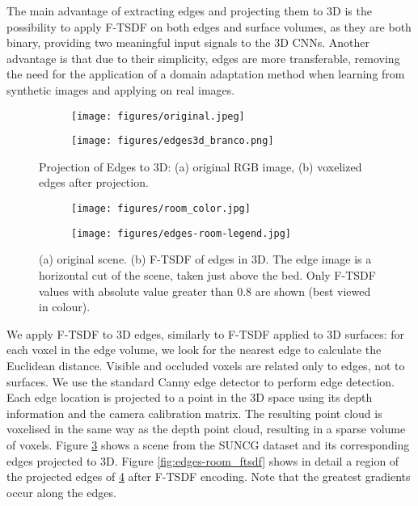 The main advantage of extracting edges and projecting them to 3D is the possibility to apply F-TSDF on both edges and surface volumes, as they are both binary, providing two meaningful input signals to the 3D CNNs.
Another advantage is that due to their simplicity,
edges are more transferable, removing the need for
the application of a domain adaptation method when learning from synthetic images and applying on real images.

\begin{figure}[t]
\centering  \begin{subfigure}{0.20\textwidth}
\texttt{[image: figures/original.jpeg]}
\caption{}
\label{fig:depth3d_original}
\end{subfigure}
\begin{subfigure}{0.20\textwidth}
\texttt{[image: figures/edges3d\_branco.png]}
\caption{}
\label{fig:depth3d_final}
\end{subfigure}
\caption{Projection of Edges to 3D: 
(a) original RGB image, 
(b) voxelized edges after projection.}
\label{fig:edges3d}
\end{figure}


\begin{figure}[t]
\centering  \begin{subfigure}{0.18\textwidth}
\texttt{[image: figures/room\_color.jpg]}
\caption{\label{fig:edges-room_original}}
\end{subfigure}
\begin{subfigure}{0.28\textwidth}
\texttt{[image: figures/edges-room-legend.jpg]}
\caption{\label{fig:edges-room_ftsdf}}
\label{fig:edges-room-legend}
\end{subfigure}
\caption{(a) original scene. 
(b) F-TSDF of edges in 3D. The edge image is a horizontal cut of the scene, taken just above the bed. Only F-TSDF values with absolute value greater than 0.8 are shown (best viewed in colour).}
\label{fig:tsdf_edges}
\end{figure}

We apply F-TSDF to 3D edges, similarly to F-TSDF applied to 3D surfaces: for each voxel in the edge volume, we look for the nearest edge to calculate the Euclidean distance. Visible and occluded voxels are related only to edges, not to surfaces. 
We use the standard Canny edge detector \cite{canny_edge_detection} to perform edge detection. Each edge location is projected to a point in the 3D space using its depth information and the camera calibration matrix. The resulting point cloud is voxelised in the same way as the depth point cloud, resulting in a sparse volume of  voxels. Figure \ref{fig:edges3d} shows a scene from the SUNCG dataset and its corresponding edges projected to 3D. 
Figure \ref{fig:edges-room_ftsdf} shows in detail a region of the projected edges of \ref{fig:edges-room_original} after F-TSDF encoding. Note that the greatest gradients occur along the edges. 



